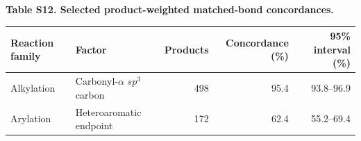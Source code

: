 {\fontsize{10}{13}\selectfont\textbf{Table S12. Selected product-weighted matched-bond concordances.}}\\[5pt]
\begin{tabular}{llrrr}
\toprule
Reaction family & Factor & Products & Concordance (\%) & 95\% interval (\%) \\
\midrule
Alkylation & Carbonyl-$\alpha$ $sp^3$ carbon & 498 & 95.4 & 93.8--96.9 \\
Arylation & Heteroaromatic endpoint & 172 & 62.4 & 55.2--69.4 \\
\bottomrule
\end{tabular}